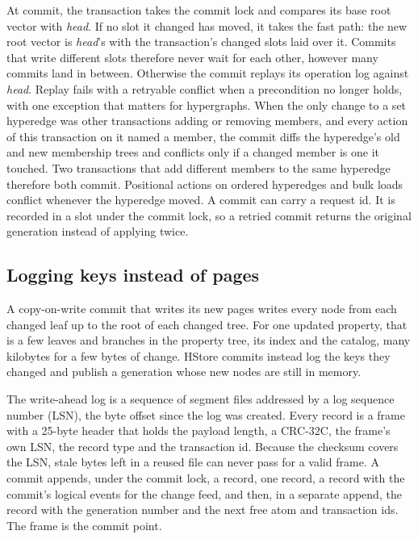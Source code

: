 At commit, the transaction takes the commit lock and compares its base root vector with \emph{head}. If no slot it changed has moved, it takes the fast path: the new root vector is \emph{head}'s with the transaction's changed slots laid over it. Commits that write different slots therefore never wait for each other, however many commits land in between. Otherwise the commit replays its operation log against \emph{head}. Replay fails with a retryable conflict when a precondition no longer holds, with one exception that matters for hypergraphs. When the only change to a set hyperedge was other transactions adding or removing members, and every action of this transaction on it named a member, the commit diffs the hyperedge's old and new membership trees and conflicts only if a changed member is one it touched. Two transactions that add different members to the same hyperedge therefore both commit. Positional actions on ordered hyperedges and bulk loads conflict whenever the hyperedge moved. A commit can carry a request id. It is recorded in a slot under the commit lock, so a retried commit returns the original generation instead of applying twice.

\subsection{Logging keys instead of pages}

A copy-on-write commit that writes its new pages writes every node from each changed leaf up to the root of each changed tree. For one updated property, that is a few leaves and branches in the property tree, its index and the catalog, many kilobytes for a few bytes of change. HStore commits instead log the keys they changed and publish a generation whose new nodes are still in memory.

The write-ahead log is a sequence of segment files addressed by a log sequence number (LSN), the byte offset since the log was created. Every record is a frame with a 25-byte header that holds the payload length, a CRC-32C, the frame's own LSN, the record type and the transaction id. Because the checksum covers the LSN, stale bytes left in a reused file can never pass for a valid frame. A commit appends, under the commit lock, a  record, one  record, a  record with the commit's logical events for the change feed, and then, in a separate append, the  record with the generation number and the next free atom and transaction ids. The  frame is the commit point.

